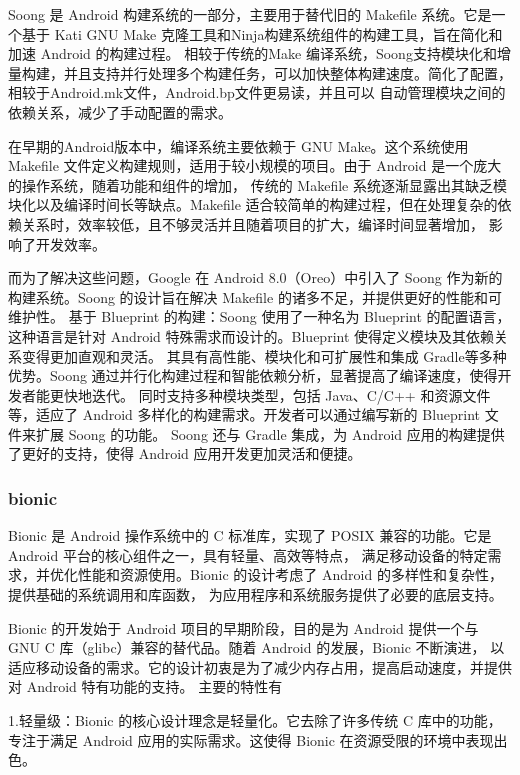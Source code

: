 Soong 是 Android 构建系统的一部分，主要用于替代旧的 Makefile 系统。它是一个基于 Kati GNU Make 克隆工具和Ninja构建系统组件的构建工具，旨在简化和加速 Android 的构建过程。
相较于传统的Make 编译系统，Soong支持模块化和增量构建，并且支持并行处理多个构建任务，可以加快整体构建速度。简化了配置，相较于Android.mk文件，Android.bp文件更易读，并且可以
自动管理模块之间的依赖关系，减少了手动配置的需求。

在早期的Android版本中，编译系统主要依赖于 GNU Make。这个系统使用 Makefile 文件定义构建规则，适用于较小规模的项目。由于 Android 是一个庞大的操作系统，随着功能和组件的增加，
传统的 Makefile 系统逐渐显露出其缺乏模块化以及编译时间长等缺点。Makefile 适合较简单的构建过程，但在处理复杂的依赖关系时，效率较低，且不够灵活并且随着项目的扩大，编译时间显著增加，
影响了开发效率。

而为了解决这些问题，Google 在 Android 8.0（Oreo）中引入了 Soong 作为新的构建系统。Soong 的设计旨在解决 Makefile 的诸多不足，并提供更好的性能和可维护性。
基于 Blueprint 的构建：Soong 使用了一种名为 Blueprint 的配置语言，这种语言是针对 Android 特殊需求而设计的。Blueprint 使得定义模块及其依赖关系变得更加直观和灵活。
其具有高性能、模块化和可扩展性和集成 Gradle等多种优势。Soong 通过并行化构建过程和智能依赖分析，显著提高了编译速度，使得开发者能更快地迭代。
同时支持多种模块类型，包括 Java、C/C++ 和资源文件等，适应了 Android 多样化的构建需求。开发者可以通过编写新的 Blueprint 文件来扩展 Soong 的功能。
Soong 还与 Gradle 集成，为 Android 应用的构建提供了更好的支持，使得 Android 应用开发更加灵活和便捷。

\subsubsection{bionic}

Bionic 是 Android 操作系统中的 C 标准库，实现了 POSIX 兼容的功能。它是 Android 平台的核心组件之一，具有轻量、高效等特点，
满足移动设备的特定需求，并优化性能和资源使用。Bionic 的设计考虑了 Android 的多样性和复杂性，提供基础的系统调用和库函数，
为应用程序和系统服务提供了必要的底层支持。

Bionic 的开发始于 Android 项目的早期阶段，目的是为 Android 提供一个与 GNU C 库（glibc）兼容的替代品。随着 Android 的发展，Bionic 不断演进，
以适应移动设备的需求。它的设计初衷是为了减少内存占用，提高启动速度，并提供对 Android 特有功能的支持。
主要的特性有

1.轻量级：Bionic 的核心设计理念是轻量化。它去除了许多传统 C 库中的功能，专注于满足 Android 应用的实际需求。这使得 Bionic 
在资源受限的环境中表现出色。

